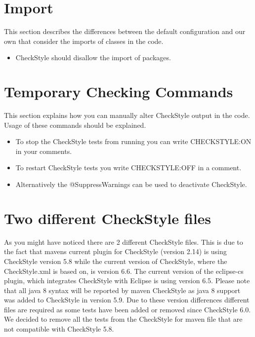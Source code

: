 \documentclass[11pt,a4paper]{report}
\begin{document}
\section{Import}

This section describes the differences between the default configuration and our own that consider the imports of classes in the code. 

\begin{itemize}

\item CheckStyle should disallow the import of packages.

\end{itemize}

\section{Temporary Checking Commands}

This section explains how you can manually alter CheckStyle output in the code. Usage of these commands should be explained.

\begin{itemize}

\item To stop the CheckStyle tests from running you can write CHECKSTYLE:ON in your comments.

\item To restart CheckStyle tests you write CHECKSTYLE:OFF in a comment.

\item Alternatively the @SuppressWarnings can be used to deactivate CheckStyle.

\end{itemize}

\section{Two different CheckStyle files}

As you might have noticed there are 2 different CheckStyle files. This is due to the fact that mavens current plugin for CheckStyle (version 2.14) is using CheckStyle version 5.8 while the current version of CheckStyle, where the CheckStyle.xml is based on, is version 6.6. The current version of the eclipse-cs plugin, which integrates CheckStyle with Eclipse is using version 6.5. Please note that all java 8 syntax will be reported by maven CheckStyle as java 8 support was added to CheckStyle in version 5.9. Due to these version differences different files are required as some tests have been added or removed since CheckStyle 6.0. We decided to remove all the tests from the CheckStyle for maven file that are not compatible with CheckStyle 5.8.
\end{document}
